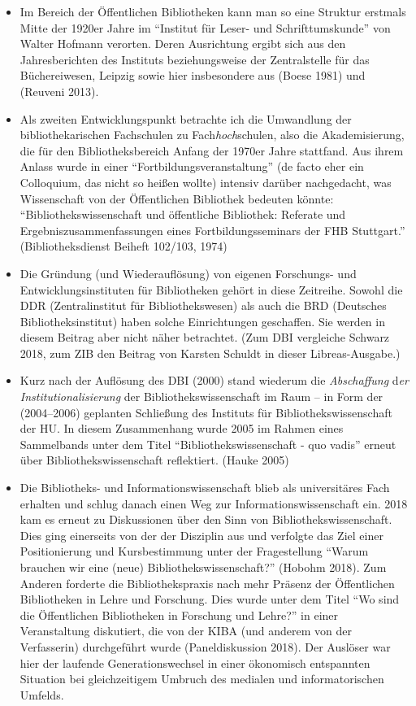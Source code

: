 \documentclass[a4paper,
fontsize=11pt,
oneside,
numbers=noperiodatend,
parskip=half-,
bibliography=totoc,
final
]{scrartcl}
\begin{document}
\begin{itemize}
\item
  Im Bereich der Öffentlichen Bibliotheken kann man so eine Struktur
  erstmals Mitte der 1920er Jahre im \enquote{Institut für Leser- und
  Schrifttumskunde} von Walter Hofmann verorten. Deren Ausrichtung
  ergibt sich aus den Jahresberichten des Instituts beziehungsweise der
  Zentralstelle für das Büchereiwesen, Leipzig sowie hier insbesondere
  aus (Boese 1981) und (Reuveni 2013).
\item
  Als zweiten Entwicklungspunkt betrachte ich die Umwandlung der
  bibliothekarischen Fachschulen zu Fach\emph{hoch}schulen, also die
  Akademisierung, die für den Bibliotheksbereich Anfang der 1970er Jahre
  stattfand. Aus ihrem Anlass wurde in einer
  \enquote{Fortbildungsveranstaltung} (de facto eher ein Colloquium, das
  nicht so heißen wollte) intensiv darüber nachgedacht, was Wissenschaft
  von der Öffentlichen Bibliothek bedeuten könnte:
  \enquote{Bibliothekswissenschaft und öffentliche Bibliothek: Referate
  und Ergebniszusammenfassungen eines Fortbildungsseminars der FHB
  Stuttgart.} (Bibliotheksdienst Beiheft 102/103, 1974)
\item
  Die Gründung (und Wiederauflösung) von eigenen Forschungs- und
  Entwicklungsinstituten für Bibliotheken gehört in diese Zeitreihe.
  Sowohl die DDR (Zentralinstitut für Bibliothekswesen) als auch die BRD
  (Deutsches Bibliotheksinstitut) haben solche Einrichtungen geschaffen.
  Sie werden in diesem Beitrag aber nicht näher betrachtet. (Zum DBI
  vergleiche Schwarz 2018, zum ZIB den Beitrag von Karsten Schuldt in
  dieser Libreas-Ausgabe.)
\item
  Kurz nach der Auflösung des DBI (2000) stand wiederum die
  \emph{Abschaffung} d\emph{er Institutionalisierung} der
  Bibliothekswissenschaft im Raum -- in Form der (2004--2006) geplanten
  Schließung des Instituts für Bibliothekswissenschaft der HU. In diesem
  Zusammenhang wurde 2005 im Rahmen eines Sammelbands unter dem Titel
  \enquote{Bibliothekswissenschaft - quo vadis} erneut über
  Bibliothekswissenschaft reflektiert. (Hauke 2005)
\item
  Die Bibliotheks- und Informationswissenschaft blieb als universitäres
  Fach erhalten und schlug danach einen Weg zur Informationswissenschaft
  ein. 2018 kam es erneut zu Diskussionen über den Sinn von
  Bibliothekswissenschaft. Dies ging einerseits von der der Disziplin
  aus und verfolgte das Ziel einer Positionierung und Kursbestimmung
  unter der Fragestellung \enquote{Warum brauchen wir eine (neue)
  Bibliothekswissenschaft?} (Hobohm 2018). Zum Anderen forderte die
  Bibliothekspraxis nach mehr Präsenz der Öffentlichen Bibliotheken in
  Lehre und Forschung. Dies wurde unter dem Titel \enquote{Wo sind die
  Öffentlichen Bibliotheken in Forschung und Lehre?} in einer
  Veranstaltung diskutiert, die von der KIBA (und anderem von der
  Verfasserin) durchgeführt wurde (Paneldiskussion 2018). Der Auslöser
  war hier der laufende Generationswechsel in einer ökonomisch
  entspannten Situation bei gleichzeitigem Umbruch des medialen und
  informatorischen Umfelds.
\end{itemize}
\end{document}

